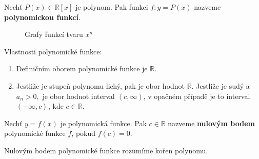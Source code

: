 \begin{definition}
    Nechť $P(x)\in \mathbb R[x]$ je polynom. Pak funkci $f\colon y=P(x)$ nazveme \textbf{polynomickou funkcí}.
\end{definition}

\begin{figure}[ht!]
  \centering
  \caption{Grafy funkcí tvaru $x^n$}
\end{figure}

\begin{pozn}
Vlastnosti polynomické funkce:
    \begin{enumerate}[$i.$]
        \item Definičním oborem polynomické funkce je $\mathbb R.$
        \item Jestliže je stupeň polynomu lichý, pak je obor hodnot $\mathbb R.$ Jestliže je sudý a $a_n > 0,$ je obor hodnot interval $\left< c,\infty \right )$,
        v opačném případě je to interval $\left (-\infty, c\right>$, kde $c \in \mathbb R$.
    \end{enumerate}
\end{pozn}

\begin{definition}
    Nechť $y=f(x)$ je polynomická funkce. Pak $c\in \mathbb R$ nazveme \textbf{nulovým bodem} polynomické funkce $f$, pokud $f(c)=0.$
\end{definition}

\begin{pozn}
    Nulovým bodem polynomické funkce rozumíme kořen polynomu.
\end{pozn}

